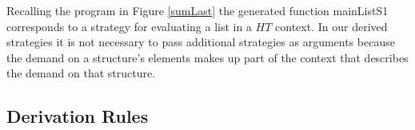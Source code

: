 Recalling the program in Figure \ref{sumLast} the generated function
\<mainListS1\> corresponds to a strategy for evaluating a list in a
$HT$ context. In our derived strategies it is not necessary to pass
additional strategies as arguments because the demand on a structure's elements
makes up part of the context that describes the demand on that structure.

\subsection*{Derivation Rules}


